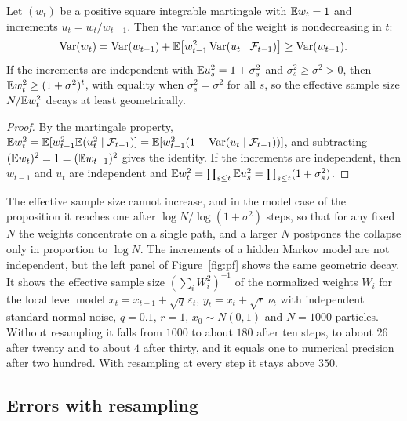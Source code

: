 \begin{proposition}
\label{prop:klw}
Let $(w_t)$ be a positive square integrable martingale with $\mathbb{E} w_t = 1$ and increments $u_t = w_t/w_{t-1}$. Then the variance of the weight is nondecreasing in $t$:
\[
\mathrm{Var}(w_t) = \mathrm{Var}(w_{t-1})+\mathbb{E}\big[w_{t-1}^2\,\mathrm{Var}(u_t\mid\mathcal{F}_{t-1})\big]\geq\mathrm{Var}(w_{t-1}).
\]
If the increments are independent with $\mathbb{E} u_s^2 = 1+\sigma_s^2$ and $\sigma_s^2\geq\sigma^2>0$, then $\mathbb{E} w_t^2\geq(1+\sigma^2)^t$, with equality when $\sigma_s^2 = \sigma^2$ for all $s$, so the effective sample size $N/\mathbb{E} w_t^2$ decays at least geometrically.
\end{proposition}

\begin{proof}
By the martingale property, $\mathbb{E} w_t^2 = \mathbb{E}[w_{t-1}^2\mathbb{E}(u_t^2\mid\mathcal{F}_{t-1})] = \mathbb{E}[w_{t-1}^2(1+\mathrm{Var}(u_t\mid\mathcal{F}_{t-1}))]$, and subtracting $(\mathbb{E} w_t)^2 = 1 = (\mathbb{E} w_{t-1})^2$ gives the identity. If the increments are independent, then $w_{t-1}$ and $u_t$ are independent and $\mathbb{E} w_t^2 = \prod_{s\leq t}\mathbb{E} u_s^2 = \prod_{s\leq t}(1+\sigma_s^2)$.
\end{proof}

The effective sample size cannot increase, and in the model case of the proposition it reaches one after $\log N/\log(1+\sigma^2)$ steps, so that for any fixed $N$ the weights concentrate on a single path, and a larger $N$ postpones the collapse only in proportion to $\log N$. The increments of a hidden Markov model are not independent, but the left panel of Figure~\ref{fig:pf} shows the same geometric decay. It shows the effective sample size $(\sum_iW_i^2)^{-1}$ of the normalized weights $W_i$ for the local level model $x_t = x_{t-1}+\sqrt q\,\varepsilon_t$, $y_t = x_t+\sqrt r\,\nu_t$ with independent standard normal noise, $q = 0.1$, $r = 1$, $x_0\sim N(0,1)$ and $N = 1000$ particles. Without resampling it falls from $1000$ to about $180$ after ten steps, to about $26$ after twenty and to about $4$ after thirty, and it equals one to numerical precision after two hundred. With resampling at every step it stays above $350$.

\subsection{Errors with resampling}

